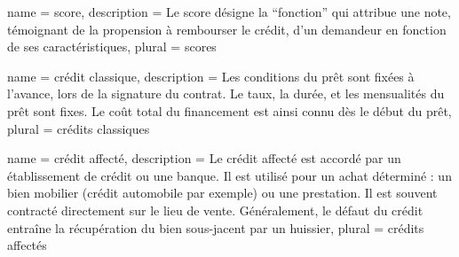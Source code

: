 


















{
	name = score,
	description = {Le score désigne la ``fonction'' qui attribue une note, témoignant de la propension à rembourser le crédit, d'un demandeur en fonction de ses caractéristiques},
	plural = scores
}



{
	name = crédit classique,
	description = {Les conditions du prêt sont fixées à l’avance, lors de la signature du contrat. Le taux, la durée, et les mensualités du prêt sont fixes. Le coût total du financement est ainsi connu dès le début du prêt},
	plural = crédits classiques
}

{
	name = crédit affecté,
	description = {Le crédit affecté est accordé par un établissement de crédit ou une banque. Il est utilisé pour un achat déterminé : un bien mobilier (crédit automobile par exemple) ou une prestation. Il est souvent contracté directement sur le lieu de vente. Généralement, le défaut du crédit entraîne la récupération du bien sous-jacent par un huissier},
	plural = crédits affectés
}

